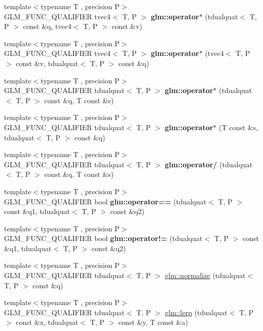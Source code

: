\begin{DoxyCompactItemize}
\item 
{\footnotesize template$<$typename T , precision P$>$ }\\G\+L\+M\+\_\+\+F\+U\+N\+C\+\_\+\+Q\+U\+A\+L\+I\+F\+I\+ER tvec4$<$ T, P $>$ {\bfseries glm\+::operator$\ast$} (tdualquat$<$ T, P $>$ const \&q, tvec4$<$ T, P $>$ const \&v)
\item 
{\footnotesize template$<$typename T , precision P$>$ }\\G\+L\+M\+\_\+\+F\+U\+N\+C\+\_\+\+Q\+U\+A\+L\+I\+F\+I\+ER tvec4$<$ T, P $>$ {\bfseries glm\+::operator$\ast$} (tvec4$<$ T, P $>$ const \&v, tdualquat$<$ T, P $>$ const \&q)
\item 
{\footnotesize template$<$typename T , precision P$>$ }\\G\+L\+M\+\_\+\+F\+U\+N\+C\+\_\+\+Q\+U\+A\+L\+I\+F\+I\+ER tdualquat$<$ T, P $>$ {\bfseries glm\+::operator$\ast$} (tdualquat$<$ T, P $>$ const \&q, T const \&s)
\item 
{\footnotesize template$<$typename T , precision P$>$ }\\G\+L\+M\+\_\+\+F\+U\+N\+C\+\_\+\+Q\+U\+A\+L\+I\+F\+I\+ER tdualquat$<$ T, P $>$ {\bfseries glm\+::operator$\ast$} (T const \&s, tdualquat$<$ T, P $>$ const \&q)
\item 
{\footnotesize template$<$typename T , precision P$>$ }\\G\+L\+M\+\_\+\+F\+U\+N\+C\+\_\+\+Q\+U\+A\+L\+I\+F\+I\+ER tdualquat$<$ T, P $>$ {\bfseries glm\+::operator/} (tdualquat$<$ T, P $>$ const \&q, T const \&s)
\item 
{\footnotesize template$<$typename T , precision P$>$ }\\G\+L\+M\+\_\+\+F\+U\+N\+C\+\_\+\+Q\+U\+A\+L\+I\+F\+I\+ER bool {\bfseries glm\+::operator==} (tdualquat$<$ T, P $>$ const \&q1, tdualquat$<$ T, P $>$ const \&q2)
\item 
{\footnotesize template$<$typename T , precision P$>$ }\\G\+L\+M\+\_\+\+F\+U\+N\+C\+\_\+\+Q\+U\+A\+L\+I\+F\+I\+ER bool {\bfseries glm\+::operator!=} (tdualquat$<$ T, P $>$ const \&q1, tdualquat$<$ T, P $>$ const \&q2)
\item 
{\footnotesize template$<$typename T , precision P$>$ }\\G\+L\+M\+\_\+\+F\+U\+N\+C\+\_\+\+Q\+U\+A\+L\+I\+F\+I\+ER tdualquat$<$ T, P $>$ \hyperlink{group__gtx__dual__quaternion_ga495818aa48c23e9e730f87a3c337d1d5}{glm\+::normalize} (tdualquat$<$ T, P $>$ const \&q)
\item 
{\footnotesize template$<$typename T , precision P$>$ }\\G\+L\+M\+\_\+\+F\+U\+N\+C\+\_\+\+Q\+U\+A\+L\+I\+F\+I\+ER tdualquat$<$ T, P $>$ \hyperlink{group__gtx__dual__quaternion_ga8039b88397ca09275be924a26a806a59}{glm\+::lerp} (tdualquat$<$ T, P $>$ const \&x, tdualquat$<$ T, P $>$ const \&y, T const \&a)

\end{DoxyCompactItemize}
